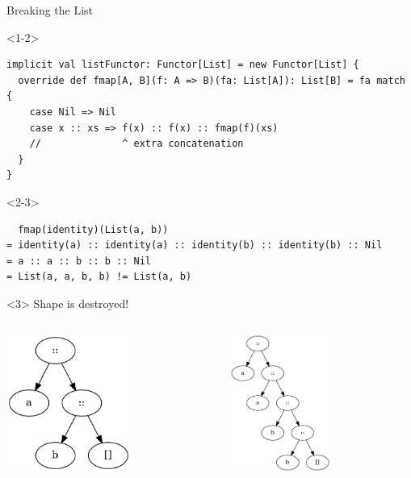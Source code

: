 \documentclass[presentation,aspectratio=169,smaller]{beamer}
\begin{document}
\begin{frame}[label={sec:org4e55d3e},fragile,t]{Breaking the List}
 \begin{onlyenv}<1-2>
\begin{verbatim}
implicit val listFunctor: Functor[List] = new Functor[List] {
  override def fmap[A, B](f: A => B)(fa: List[A]): List[B] = fa match {
    case Nil => Nil
    case x :: xs => f(x) :: f(x) :: fmap(f)(xs)
    //              ^ extra concatenation
  }
}
\end{verbatim}
\end{onlyenv}

\begin{onlyenv}<2-3>
\begin{verbatim}
  fmap(identity)(List(a, b))
= identity(a) :: identity(a) :: identity(b) :: identity(b) :: Nil
= a :: a :: b :: b :: Nil
= List(a, a, b, b) != List(a, b)
\end{verbatim}
\end{onlyenv}

\begin{onlyenv}<3>
Shape is destroyed!

\begin{columns}
\begin{column}[t]{0.5\columnwidth}
\begin{center}
\includegraphics[height=4.5cm]{.dot/functor-list-broken-1.png}
\end{center}
\end{column}

\begin{column}[t]{0.5\columnwidth}
\begin{center}
\includegraphics[height=4.5cm]{.dot/functor-list-broken-2.png}
\end{center}
\end{column}
\end{columns}
\end{onlyenv}
\end{frame}
\end{document}
